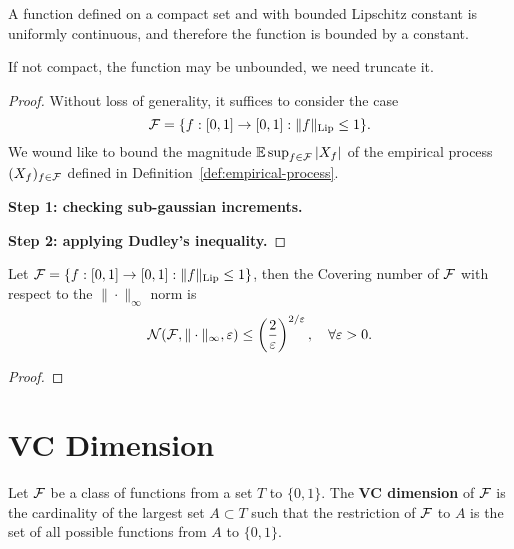 A function defined on a compact set and with bounded Lipschitz constant is uniformly continuous, and therefore the function is bounded by a constant.

If not compact, the function may be unbounded, we need truncate it.

\begin{proof}
	Without loss of generality, it suffices to consider the case
	\begin{equation*}
		\mathcal{F}=\{f:[0,1]\to[0,1]:\|f\|_{\text{Lip}}\leq 1\}.
	\end{equation*}
	We wound like to bound the magnitude \(\mathbb{E}\sup_{f\in\mathcal{F}}|X_{f}|\) of the empirical process \((X_{f})_{f\in\mathcal{F}}\) defined in Definition~\ref{def:empirical-process}.

	\textbf{Step 1: checking sub-gaussian increments.}

	\textbf{Step 2: applying Dudley's inequality.}
\end{proof}

\begin{lemma}
	Let \(\mathcal{F}=\{f:[0,1]\to[0,1]:\|f\|_{\text{Lip}}\leq 1\}\), then the Covering number of \(\mathcal{F}\) with respect to the \(\|\cdot\|_{\infty}\) norm is
	\begin{equation*}
		\mathcal{N}(\mathcal{F},\|\cdot\|_{\infty},\varepsilon)\leq\left(\frac{2}{\varepsilon}\right)^{2/\varepsilon},\quad\forall\varepsilon>0.
	\end{equation*}
\end{lemma}

\begin{proof}

\end{proof}

\section{VC Dimension}

\begin{definition}[VC Dimension]
	Let \(\mathcal{F}\) be a class of functions from a set \(T\) to \(\{0,1\}\). The \textbf{VC dimension} of \(\mathcal{F}\) is the cardinality of the largest set \(A\subset T\) such that the restriction of \(\mathcal{F}\) to \(A\) is the set of all possible functions from \(A\) to \(\{0,1\}\).
\end{definition}

\begin{example}[Intervals]

\end{example}

